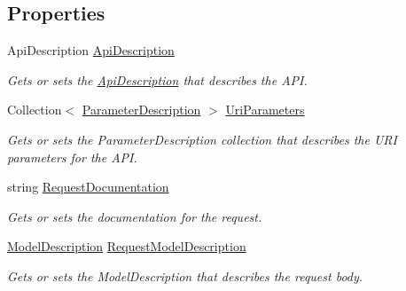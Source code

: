 \subsection*{Properties}
\begin{DoxyCompactItemize}
\item 
Api\+Description \hyperlink{class_wis_r_rest_a_p_i_1_1_areas_1_1_help_page_1_1_models_1_1_help_page_api_model_a40fa47cb8964daa794f040d88a9872fd}{Api\+Description}
\begin{DoxyCompactList}\small\item\em Gets or sets the \hyperlink{class_wis_r_rest_a_p_i_1_1_areas_1_1_help_page_1_1_models_1_1_help_page_api_model_a40fa47cb8964daa794f040d88a9872fd}{Api\+Description} that describes the A\+P\+I. \end{DoxyCompactList}\item 
Collection$<$ \hyperlink{class_wis_r_rest_a_p_i_1_1_areas_1_1_help_page_1_1_model_descriptions_1_1_parameter_description}{Parameter\+Description} $>$ \hyperlink{class_wis_r_rest_a_p_i_1_1_areas_1_1_help_page_1_1_models_1_1_help_page_api_model_ad0307446265c50680d95d924e8d6a2f5}{Uri\+Parameters}
\begin{DoxyCompactList}\small\item\em Gets or sets the Parameter\+Description collection that describes the U\+R\+I parameters for the A\+P\+I. \end{DoxyCompactList}\item 
string \hyperlink{class_wis_r_rest_a_p_i_1_1_areas_1_1_help_page_1_1_models_1_1_help_page_api_model_a9e88686f5876aad187feb821434c99fc}{Request\+Documentation}
\begin{DoxyCompactList}\small\item\em Gets or sets the documentation for the request. \end{DoxyCompactList}\item 
\hyperlink{class_wis_r_rest_a_p_i_1_1_areas_1_1_help_page_1_1_model_descriptions_1_1_model_description}{Model\+Description} \hyperlink{class_wis_r_rest_a_p_i_1_1_areas_1_1_help_page_1_1_models_1_1_help_page_api_model_acb5ad26478d81154a979ded9a2416f31}{Request\+Model\+Description}
\begin{DoxyCompactList}\small\item\em Gets or sets the Model\+Description that describes the request body. \end{DoxyCompactList}\item 

\end{DoxyCompactItemize}
